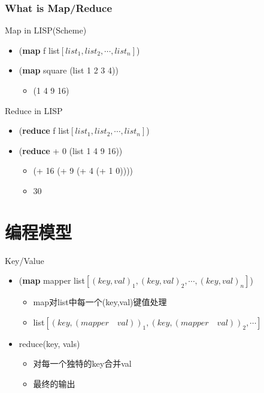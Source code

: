 \documentclass{beamer}
\begin{document}
\begin{frame}
    \frametitle{What is Map/Reduce}
    \begin{block}{Map in LISP(Scheme)}
        \begin{itemize}
        \item (\textbf{map} f list$\left[list_1, list_2, \cdots, list_n \right]$)
        \item (\textbf{map} square (list 1 2 3 4))
            \begin{itemize}
            \item (1 4 9 16)    
            \end{itemize}
        \end{itemize}
    \end{block}
    
    \begin{block}{Reduce in LISP}
        \begin{itemize}
        \item (\textbf{reduce} f list$\left[list_1, list_2, \cdots, list_n \right]$)
        \item (\textbf{reduce} + 0 (list 1 4 9 16))
            \begin{itemize}
            \item (+ 16 (+ 9 (+ 4 (+ 1 0))))
            \item 30
            \end{itemize}
        \end{itemize}
    \end{block}
\end{frame}

\section{编程模型}
\begin{frame}{Key/Value}
    \begin{itemize}
    \item (\textbf{map} mapper list$\left[(key,val)_1, (key,val)_2, \cdots, (key,val)_n \right]$)
        \begin{itemize}
        \item map对list中每一个(key,val)键值处理
        \item list$\left[(key,(mapper \quad val))_1, (key,(mapper \quad val))_2, \cdots\right]$ 
        \end{itemize}
    \item reduce(key, vals)
        \begin{itemize}
        \item 对每一个独特的key合并val
        \item 最终的输出
        \end{itemize}
    \end{itemize}
\end{frame}
\end{document}
